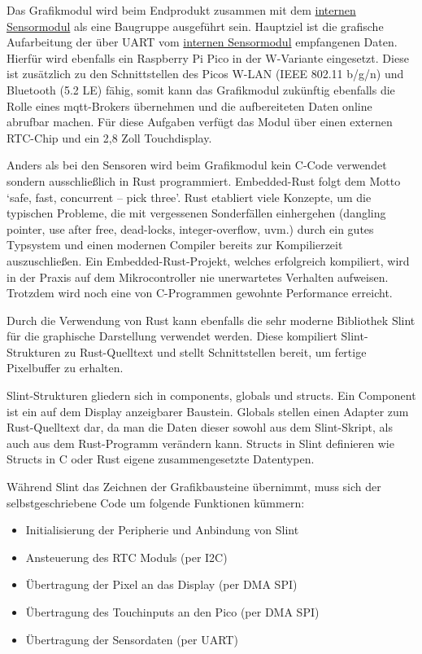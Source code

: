 \documentclass[a4paper,11pt]{article}
\begin{document}
Das Grafikmodul wird beim Endprodukt zusammen mit dem \hyperref[subsubsub:sensormodulInt]{internen Sensormodul} als eine Baugruppe ausgeführt sein.
Hauptziel ist die grafische Aufarbeitung der über UART vom \hyperref[subsubsub:sensormodulInt]{internen Sensormodul} empfangenen Daten.
Hierfür wird ebenfalls ein Raspberry Pi Pico in der W-Variante eingesetzt.
Diese ist zusätzlich zu den Schnittstellen des Picos W-LAN (IEEE 802.11 b/g/n) und Bluetooth (5.2 LE) fähig, somit kann das Grafikmodul zukünftig ebenfalls die Rolle eines mqtt-Brokers übernehmen und die aufbereiteten Daten online abrufbar machen.
Für diese Aufgaben verfügt das Modul über einen externen RTC-Chip und ein 2,8 Zoll Touchdisplay.

\vspace{0.3cm}
\noindent
Anders als bei den Sensoren wird beim Grafikmodul kein C-Code verwendet sondern ausschließlich in Rust programmiert.
Embedded-Rust folgt dem Motto \textquoteleft safe, fast, concurrent – pick three\textquoteright.
Rust etabliert viele Konzepte, um die typischen Probleme, die mit vergessenen Sonderfällen einhergehen (dangling pointer, use after free, dead-locks, integer-overflow, uvm.) durch ein gutes Typsystem und einen modernen Compiler bereits zur Kompilierzeit auszuschließen.
Ein Embedded-Rust-Projekt, welches erfolgreich kompiliert, wird in der Praxis auf dem Mikrocontroller nie unerwartetes Verhalten aufweisen.
Trotzdem wird noch eine von C-Programmen gewohnte Performance erreicht.

\vspace{0.3cm}
\noindent
Durch die Verwendung von Rust kann ebenfalls die sehr moderne Bibliothek Slint für die graphische Darstellung verwendet werden. Diese kompiliert Slint-Strukturen zu Rust-Quelltext und stellt Schnittstellen bereit, um fertige Pixelbuffer zu erhalten.

\vspace{0.3cm}
\noindent
Slint-Strukturen gliedern sich in components, globals und structs.
Ein Component ist ein auf dem Display anzeigbarer Baustein.
Globals stellen einen Adapter zum Rust-Quelltext dar, da man die Daten dieser sowohl aus dem Slint-Skript, als auch aus dem Rust-Programm verändern kann.
Structs in Slint definieren wie Structs in C oder Rust eigene zusammengesetzte Datentypen.



\vspace{0.3cm}
\noindent
Während Slint das Zeichnen der Grafikbausteine übernimmt, muss sich der selbstgeschriebene Code um folgende Funktionen kümmern:
\begin{itemize}
	\item Initialisierung der Peripherie und Anbindung von Slint
	\item Ansteuerung des RTC Moduls (per I2C)
	\item Übertragung der Pixel an das Display (per DMA SPI)
	\item Übertragung des Touchinputs an den Pico (per DMA SPI)
	\item Übertragung der Sensordaten (per UART)
\end{itemize}
\end{document}

